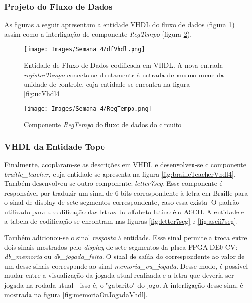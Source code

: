 \documentclass[amsmath,amssymb,floatfix]{report}
\begin{document}
\subsubsection{Projeto do Fluxo de Dados}
\label{subsubsec:dfVhdl4}

As figuras a seguir apresentam a entidade VHDL do fluxo de dados (figura \ref{fig:dfVhdl4}) assim como a interligação do componente \textit{RegTempo} (figura \ref{fig:RegTempo}).

\begin{figure}[H]
    \centering
    \texttt{[image: Images/Semana 4/dfVhdl.png]}
    \caption{Entidade do Fluxo de Dados codificada em VHDL. A nova entrada \textit{registraTempo} conecta-se diretamente à entrada de mesmo nome da unidade de controle, cuja entidade se encontra na figura \ref{fig:ucVhdl4}}
    \label{fig:dfVhdl4}
\end{figure}

\begin{figure}[H]
    \centering
    \texttt{[image: Images/Semana 4/RegTempo.png]}
    \caption{Componente \textit{RegTempo} do fluxo de dados do circuito}
    \label{fig:RegTempo}
\end{figure}

\subsubsection{VHDL da Entidade Topo}
\label{subsubsec:btVhdl4}

Finalmente, acoplaram-se as descrições em VHDL e desenvolveu-se o componente \textit{braille\_teacher}, cuja entidade se apresenta na figura \ref{fig:brailleTeacherVhdl4}. Também desenvolveu-se outro componente: \textit{letter7seg}. Esse componente é responsável por traduzir um sinal de 6 bits correspondente à letra em Braille para o sinal de display de sete segmentos correspondente, caso essa exista. O padrão utilizado para a codificação das letras do alfabeto latino é o ASCII. A entidade e a tabela de codificação se encontram nas figuras \ref{fig:letter7seg} e \ref{fig:ascii7seg}.

Também adicionou-se o sinal \textit{resposta} à entidade. Esse sinal permite a troca entre dois sinais mostrados pelo \textit{display} de sete segmentos da placa FPGA DE0-CV: \textit{db\_memoria} ou \textit{db\_jogada\_feita}. O sinal de saída do correspondente ao valor de um desse sinais corresponde ao sinal \textit{memoria\_ou\_jogada}. Desse modo, é possível mudar entre a visualização da jogada atual realizada e a letra que deveria ser jogada na rodada atual---isso é, o "gabarito" do jogo. A interligação desse sinal é mostrada na figura \ref{fig:memoriaOuJogadaVhdl}.
\end{document}
